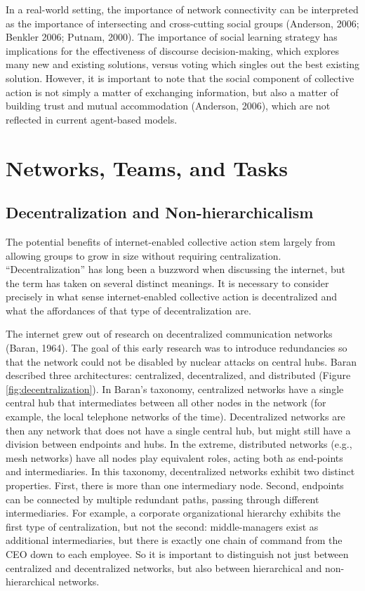 In a real-world setting, the importance of network connectivity can be interpreted as the importance of intersecting and cross-cutting social groups (Anderson, 2006; Benkler 2006; Putnam, 2000). The importance of social learning strategy has implications for the effectiveness of discourse decision-making, which explores many new and existing solutions, versus voting which singles out the best existing solution. However, it is important to note that the social component of collective action is not simply a matter of exchanging information, but also a matter of building trust and mutual accommodation (Anderson, 2006), which are not reflected in current agent-based models.

\section{Networks, Teams, and Tasks}\label{sec:network-teams}
\subsection{Decentralization and Non-hierarchicalism}
The potential benefits of internet-enabled collective action stem largely from allowing groups to grow in size without requiring centralization. ``Decentralization'' has long been a buzzword when discussing the internet, but the term has taken on several distinct meanings. It is necessary to consider precisely in what sense internet-enabled collective action is decentralized and what the affordances of that type of decentralization are.

The internet grew out of research on decentralized communication networks (Baran, 1964). The goal of this early research was to introduce redundancies so that the network could not be disabled by nuclear attacks on central hubs. Baran described three architectures: centralized, decentralized, and distributed (Figure \ref{fig:decentralization}). In Baran's taxonomy, centralized networks have a single central hub that intermediates between all other nodes in the network (for example, the local telephone networks of the time). Decentralized networks are then any network that does not have a single central hub, but might still have a division between endpoints and hubs. In the extreme, distributed networks (e.g., mesh networks) have all nodes play equivalent roles, acting both as end-points and intermediaries. In this taxonomy, decentralized networks exhibit two distinct properties. First, there is more than one intermediary node. Second, endpoints can be connected by multiple redundant paths, passing through different intermediaries. For example, a corporate organizational hierarchy exhibits the first type of centralization, but not the second: middle-managers exist as additional intermediaries, but there is exactly one chain of command from the CEO down to each employee. So it is important to distinguish not just between centralized and decentralized networks, but also between hierarchical and non-hierarchical networks.

